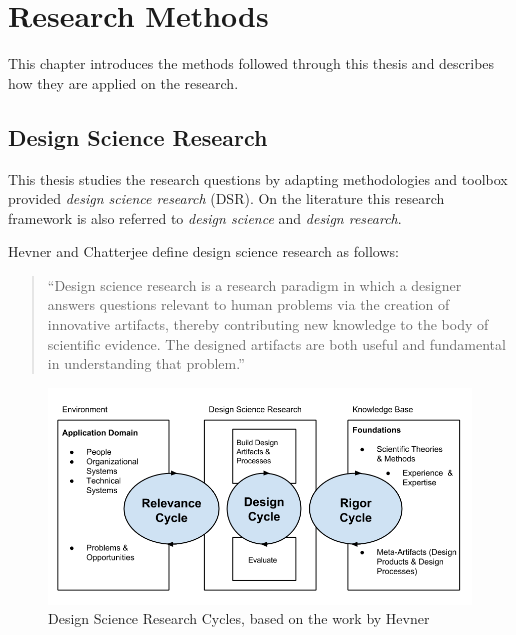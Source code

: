 
\chapter{Research Methods}

This chapter introduces the methods followed through this thesis and describes how they are applied on the research.





\section{Design Science Research}


This thesis studies the research questions by adapting methodologies and toolbox provided \textit{design science research} (DSR). On the literature this research framework is also referred to \textit{design science} and \textit{design research}.

Hevner and Chatterjee \cite{hevner_design_2010} define design science research as follows:
\begin{quote}
	``Design science research is a research paradigm in which a designer answers questions relevant to human problems via the creation of innovative artifacts, thereby contributing new knowledge to the body of scientific evidence. The designed artifacts are both useful and fundamental in understanding that problem.''
\end{quote}

\begin{figure}
\begin{center}
\includegraphics[width=1\textwidth]{assets/dsrcycles.png}
\end{center}
\caption{Design Science Research Cycles, based on the work by Hevner \cite{hevner_three_2007}}
\label{fig:dsrcycles}
\end{figure}


